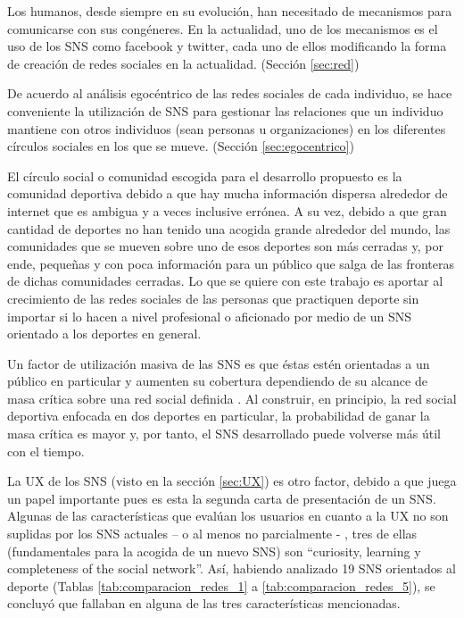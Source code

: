 Los humanos, desde siempre en su evolución, han necesitado de mecanismos para comunicarse con sus congéneres. En la actualidad, uno de los mecanismos es el uso de los SNS como facebook y twitter, cada uno de ellos modificando la forma de creación de redes sociales en la actualidad. (Sección \ref{sec:red})

De acuerdo al análisis egocéntrico de las redes sociales de cada individuo, se hace conveniente la utilización de SNS para gestionar las relaciones que un individuo mantiene con otros individuos (sean personas u organizaciones) en los diferentes círculos sociales en los que se mueve. (Sección \ref{sec:egocentrico})

El círculo social o comunidad escogida para el desarrollo propuesto es la comunidad deportiva debido a que hay mucha información dispersa alrededor de internet que es ambigua y a veces inclusive errónea. A su vez, debido a que gran cantidad de deportes no han tenido una acogida grande alrededor del mundo, las comunidades que se mueven sobre uno de esos deportes son más cerradas y, por ende, pequeñas y con poca información para un público que salga de las fronteras de dichas comunidades cerradas. Lo que se quiere con este trabajo es aportar al crecimiento de las redes sociales de las personas que practiquen deporte sin importar si lo hacen a nivel profesional o aficionado por medio de un SNS orientado a los deportes en general.

Un factor de utilización masiva de las SNS es que éstas estén orientadas a un público en particular y aumenten su cobertura dependiendo de su alcance de masa crítica sobre una red social definida \cite{sna_startups}. Al construir, en principio, la red social deportiva enfocada en dos deportes en particular, la probabilidad de ganar la masa crítica es mayor y, por tanto, el SNS desarrollado puede volverse más útil con el tiempo.

La UX de los SNS (visto en la sección \ref{sec:UX}) es otro factor, debido a que juega un papel importante pues es esta la segunda carta de presentación de un SNS. Algunas de las características que evalúan los usuarios en cuanto a la UX no son suplidas por los SNS actuales – o al menos no parcialmente - , tres de ellas (fundamentales para la acogida de un nuevo SNS) son “curiosity, learning y completeness of the social network”. Así, habiendo analizado 19 SNS orientados al deporte (Tablas \ref{tab:comparacion_redes_1} a \ref{tab:comparacion_redes_5}), se concluyó que fallaban en alguna de las tres características mencionadas.

